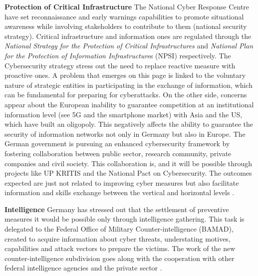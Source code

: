 \textbf{Protection of Critical Infrastructure} The National Cyber Response Centre have set reconnaissance and early warnings capabilities to promote situational awareness while involving stakeholders to contribute to them (national security strategy). Critical infrastructure and information ones are regulated through the \textit{National Strategy for the Protection of Critical Infrastructures} \autocite{federalofficeforinformationsecurity_2022_up} and \textit{National Plan for the Protection of Information Infrastructure}s (NPSI) respectively. The Cybersecurity strategy stress out the need to replace reactive measure with proactive ones. A problem that emerges on this page is linked to the voluntary nature of strategic entities in participating in the exchange of information, which can be fundamental for preparing for cyberattacks. On the other side, concerns appear about the European inability to guarantee competition at an institutional information level (see 5G and the smartphone market) with Asia and the US, which have built an oligopoly. This negatively affects the ability to guarantee the security of information networks not only in Germany but also in Europe. The German government is pursuing an enhanced cybersecurity framework by fostering collaboration between public sector, research community, private companies and civil society. This collaboration is, and it will be possible through projects like UP KRITIS and the National Pact on Cybersecurity. The outcomes expected are just not related to improving cyber measures but also facilitate information and skills exchange between the vertical and horizontal levels \autocite{federalofficeforinformationsecurity_2022_up, federalministryoftheinteriorbuildingandcommunity_2021_cyber, thefederalgovernmentofgermany_2023_robust}.

\textbf{Intelligence} Germany has stressed out that the settlement of preventive measures it would be possible only through intelligence gathering. This task is delegated to the Federal Office of Military Counter-intelligence (BAMAD), created to acquire information about cyber threats, understating motives, capabilities and attack vectors to prepare the victims. The work of the new counter-intelligence subdivision goes along with the cooperation with other federal intelligence agencies and the private sector \autocite{theinternationalinstituteforstrategicstudies_2023_cyber}. 

